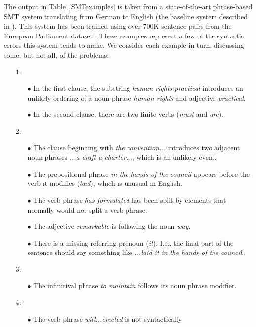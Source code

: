 \documentclass[10pt]{report}
\theoremstyle{plain}
\begin{document}
{The output in Table~\ref{SMTexamples} is taken from a state-of-the-art
phrase-based SMT system translating from German to English (the
baseline system described in ). This
system has been trained using over 700K sentence pairs from the
European Parliament dataset . These examples represent a
few of the syntactic errors this system tends to make. We consider
each example in turn, discussing some, but not all, of the problems:

\begin{itemize}
\item[1:] 
\begin{itemize}
\item[$\bullet$] In the first clause, the substring {\em human rights practical}
introduces an unlikely ordering of a noun phrase {\em human rights}
and adjective {\em practical}.
\item[$\bullet$] In the second clause, there are two finite verbs ({\em must} and
{\em are}).
\end{itemize}
\item[2:]
\begin{itemize}
\item[$\bullet$] The clause beginning with {\em the convention...} introduces two
adjacent noun phrases {\em ...a draft a charter...}, which is an
unlikely event.
\item[$\bullet$] The prepositional phrase {\em in the hands of the council}
appears before the verb it modifies ({\em laid}), which is unusual in
English.
\item[$\bullet$] The verb phrase {\em has formulated} has been split by elements
that normally would not split a verb phrase.
\item[$\bullet$] The adjective {\em remarkable} is following the noun {\em way}.
\item[$\bullet$] There is a missing referring pronoun ({\em it}). I.e., the final
part of the sentence should say something like {\em ...laid it in the
hands of the council}.
\end{itemize}
\item[3:]
\begin{itemize}
\item[$\bullet$] The infinitival phrase {\em to maintain} follows its
noun phrase modifier.
\end{itemize}
\item[4:]
\begin{itemize}
\item[$\bullet$] The verb phrase {\em will...erected} is not syntactically

\end{itemize}
\end{itemize}}
\end{document}
